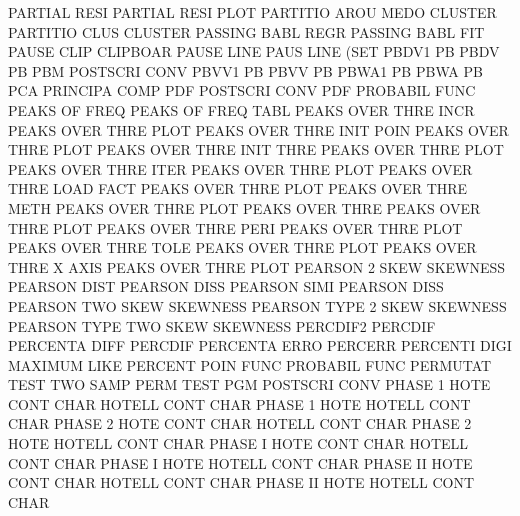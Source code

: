 PARTIAL  RESI                           PARTIAL  RESI PLOT
PARTITIO AROU MEDO                      CLUSTER
PARTITIO CLUS                           CLUSTER
PASSING  BABL REGR                      PASSING  BABL FIT
PAUSE    CLIP                           CLIPBOAR
PAUSE    LINE                           PAUS     LINE (SET
PBDV1                                   PB
PBDV                                    PB
PBM                                     POSTSCRI CONV
PBVV1                                   PB
PBVV                                    PB
PBWA1                                   PB
PBWA                                    PB
PCA                                     PRINCIPA COMP
PDF                                     POSTSCRI CONV
PDF                                     PROBABIL FUNC
PEAKS    OF   FREQ                      PEAKS    OF   FREQ TABL
PEAKS    OVER THRE INCR                 PEAKS    OVER THRE PLOT
PEAKS    OVER THRE INIT POIN            PEAKS    OVER THRE PLOT
PEAKS    OVER THRE INIT THRE            PEAKS    OVER THRE PLOT
PEAKS    OVER THRE ITER                 PEAKS    OVER THRE PLOT
PEAKS    OVER THRE LOAD FACT            PEAKS    OVER THRE PLOT
PEAKS    OVER THRE METH                 PEAKS    OVER THRE PLOT
PEAKS    OVER THRE                      PEAKS    OVER THRE PLOT
PEAKS    OVER THRE PERI                 PEAKS    OVER THRE PLOT
PEAKS    OVER THRE TOLE                 PEAKS    OVER THRE PLOT
PEAKS    OVER THRE X    AXIS            PEAKS    OVER THRE PLOT
PEARSON  2    SKEW                      SKEWNESS
PEARSON  DIST                           PEARSON  DISS
PEARSON  SIMI                           PEARSON  DISS
PEARSON  TWO  SKEW                      SKEWNESS
PEARSON  TYPE 2    SKEW                 SKEWNESS
PEARSON  TYPE TWO  SKEW                 SKEWNESS
PERCDIF2                                PERCDIF
PERCENTA DIFF                           PERCDIF
PERCENTA ERRO                           PERCERR
PERCENTI DIGI                           MAXIMUM  LIKE
PERCENT  POIN FUNC                      PROBABIL FUNC
PERMUTAT TEST                           TWO      SAMP PERM TEST
PGM                                     POSTSCRI CONV
PHASE    1    HOTE CONT CHAR            HOTELL   CONT CHAR
PHASE    1    HOTE                      HOTELL   CONT CHAR
PHASE    2    HOTE CONT CHAR            HOTELL   CONT CHAR
PHASE    2    HOTE                      HOTELL   CONT CHAR
PHASE    I    HOTE CONT CHAR            HOTELL   CONT CHAR
PHASE    I    HOTE                      HOTELL   CONT CHAR
PHASE    II   HOTE CONT CHAR            HOTELL   CONT CHAR
PHASE    II   HOTE                      HOTELL   CONT CHAR
